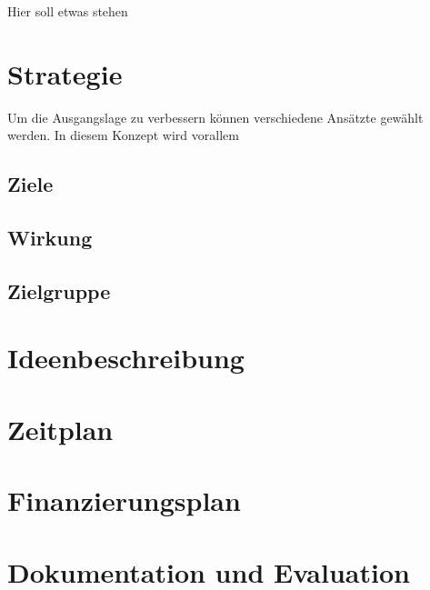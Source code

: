 Hier soll etwas stehen

\chapter{Strategie}
Um die Ausgangslage zu verbessern können verschiedene Ansätzte gewählt werden. In diesem Konzept wird vorallem

\section{Ziele}

\section{Wirkung}

\section{Zielgruppe}

\chapter{Ideenbeschreibung}

\chapter{Zeitplan}

\chapter{Finanzierungsplan}

\chapter{Dokumentation und Evaluation}